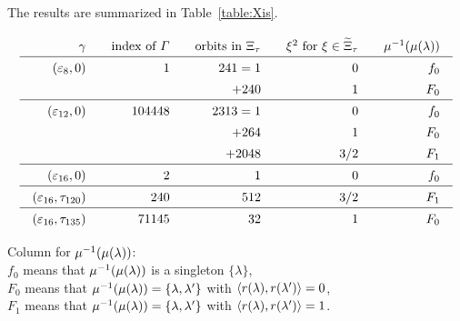 \documentclass{amsart} %
\begin{document}
%
The results are summarized in Table~\ref{table:Xis}.
%
%
\begin{table}
\[
\setlength{\arraycolsep}{10pt}
\renewcommand{\arraystretch}{1.4}
\begin{array}{rrrrr}
\gamma &\textrm{index of $\vGam$} &\textrm{orbits in $\Xitau$} & \xi^2 \textrm{ for } \xi\in \tilXitau&\mu\inv(\mu(\lambda))\\
\hline 
(\vep_8, 0) &1 & 241= 1 & 0 & f_0 \\
  & & +240 & 1 & F_0 \\
\hline 
(\vep_{12}, 0) &104448 & 2313= 1 & 0 & f_0 \\
  & & +264 & 1 & F_0 \\
  & & +2048 & 3/2 & F_1 \\
 \hline 
(\vep_{16}, 0) &2& 1 & 0 & f_0 \\
\hline 
(\vep_{16},\tauI) &240& 512 & 3/2 & F_1 \\
\hline 
(\vep_{16},\tauII) &71145 & 32 & 1 & F_0 \\  
\end{array}
\]
\vskip 3mm
%
\parbox{12cm}{
Column for  $\mu^{-1}(\mu(\lambda))$: \\
$f_0$ means that $\mu^{-1}(\mu(\lambda))$ is a singleton $\{\lambda\}$,
\\
$ F_0$ means that $\mu^{-1}(\mu(\lambda))=\{\lambda, \lambda^{\prime}\}$ with $\langle r(\lambda), r(\lambda^{\prime}) \rangle=0$, 
\\
$ F_1$ means that $\mu^{-1}(\mu(\lambda))=\{\lambda, \lambda^{\prime}\}$ with $\langle r(\lambda), r(\lambda^{\prime}) \rangle=1$.
}
%
%
\vskip 5mm
\caption{Index $[\OG(\Lplus, \PPPplus): \vGam]$ and orbit decomposition of walls}\label{table:Xis}
\end{table}
%
\end{document}
